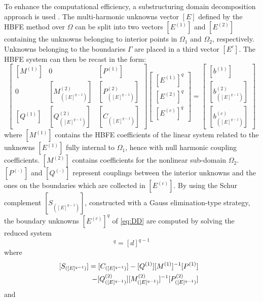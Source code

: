 \documentclass[journal]{IEEEtran}
\begin{document}
\par To enhance the computational efficiency, a substructuring domain decomposition approach is used \cite{Toselli2005, Guarnieri2009, Guarnieri2010, Saad2000}. The multi-harmonic unknowns vector $[E]$ defined by the HBFE method over $\Omega$ can be split into two vectors $[E^{(1)}]$ and $[E^{(2)}]$
containing the unknowns belonging to interior points in $\Omega_1$ and $\Omega_2$, respectively. Unknowns belonging to the boundaries $\Gamma$ are placed in a third vector $[E^c]$. The HBFE system can then be recast in the form:
\begin{equation}\label{eq:DD}
\scriptstyle
\left [ \begin{array}{cccccc}
\scriptstyle [M^{(1)}] & \scriptstyle 0  &  \scriptstyle[P^{(1)}] \\
\scriptstyle 0  &  \scriptstyle[M_{([E]^{q-1})}^{(2)}] & \scriptstyle[P_{([E]^{q-1})}^{(2)}] \\
\scriptstyle{[Q^{(1)}]} & \scriptstyle{[Q_{([E]^{q-1})}^{(2)}]} & \scriptstyle{[C_{([E]^{q-1})}]}
\end{array} \right ]
\left [ \begin{array}{cc}
\scriptstyle{[E^{(1)}]^{q}} \\
\scriptstyle{[E^{(2)}]^{q}} \\
\scriptstyle{[E^{(c)}]^{q}}
\end{array} \right ] = \left [ \begin{array}{cc}
\scriptstyle{[b^{(1)}]} \\
\scriptstyle{[b_{([E]^{q-1})}^{(2)}]} \\
\scriptstyle{[b_{([E]^{q-1})}^{(c)}]}
\end{array} \right ] 
\end{equation}
where $[M^{(1)}]$ contains the HBFE coefficients of the linear system related to the unknowns $[E^{(1)}]$ fully internal to $\Omega_1$, hence with null harmonic coupling coefficients. $[M^{(2)}]$ contains coefficients for the nonlinear sub-domain $\Omega_2$. ${[P^{(\cdot)}]}$ and ${[Q^{(\cdot)}]}$ represent couplings between the interior unknowns and the ones on the boundaries which are collected in $[E^{(c)}]$. By using the Schur complement $[S_{([E]^{q-1})}]$, constructed with a Gauss elimination-type strategy, the boundary unknowns $[E^{(c)}]^{q}$ of \eqref{eq:DD} are computed by solving the reduced system
\begin{equation}
[S_{([E]^{q-1})}] [E^{(c)}]^{q} = [d]^{q-1} 
\end{equation} where
\begin{eqnarray}
\label{eq:shurS}
& & \hspace{-1cm} [S_{([E]^{q-1})}] = [C_{([E]^{q-1})}] - [Q^{(1)}][M^{(1)}]^{-1} [P^{(1)}] \nonumber \\
& & \hspace{1cm}- [Q_{([E]^{q-1})}^{(2)}][M_{([E]^{q-1})}^{(2)}]^{-1} [P_{([E]^{q-1})}^{(2)}]
\end{eqnarray} and
\end{document}
